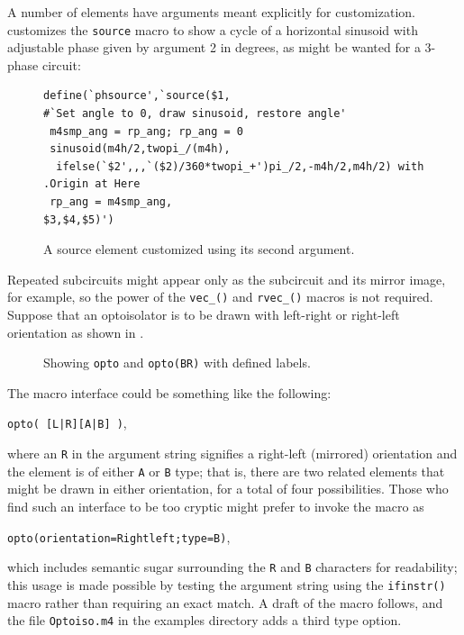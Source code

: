 \pagebreak
{}
A number of elements have arguments meant explicitly for customization.
 customizes the {\tt source} macro to show a cycle of a horizontal sinusoid with adjustable phase given by argument 2 in degrees,
as might be wanted for a 3-phase circuit:
\begin{figure}[H]
\hfill
 \vspace*{-0.5in}
\begin{verbatim}
define(`phsource',`source($1,
#`Set angle to 0, draw sinusoid, restore angle'
 m4smp_ang = rp_ang; rp_ang = 0
 sinusoid(m4h/2,twopi_/(m4h),
  ifelse(`$2',,,`($2)/360*twopi_+')pi_/2,-m4h/2,m4h/2) with .Origin at Here
 rp_ang = m4smp_ang,
$3,$4,$5)')
\end{verbatim}
\vspace*{-\baselineskip}
   \caption{A source element customized using its second argument.}
   \label{Sinus}
   \end{figure}

Repeated subcircuits might appear only
as the subcircuit and its mirror image, for example, so the
power of the \verb|vec_()| and \verb|rvec_()| macros is not required.
Suppose that an optoisolator is to be drawn with left-right or right-left
orientation as shown in .
\begin{figure}[H]
   
   \caption{Showing {\tt opto} and {\tt opto(BR)} with defined labels.}
   \label{Opto}
   \end{figure}

The macro interface could be something like the following:
\par
{\tt opto( [L|R][A|B] )},

\noindent where an {\tt R} in the argument string signifies a right-left
(mirrored) orientation and the element is of either {\tt A} or {\tt B} type;
that is, there are two related elements that might be drawn in either
orientation, for a total of four possibilities.
Those who find such an interface to be too cryptic might prefer to
invoke the macro as
\par
{\tt opto(orientation=Rightleft;type=B)},

\noindent
which includes semantic sugar surrounding the {\tt R} and {\tt B} characters
for readability; this usage is made possible by testing the argument string
using the {\tt ifinstr()} macro rather than requiring an exact match.
A draft of the macro follows, and the file {\tt Optoiso.m4} in the examples
directory adds a third type option.


